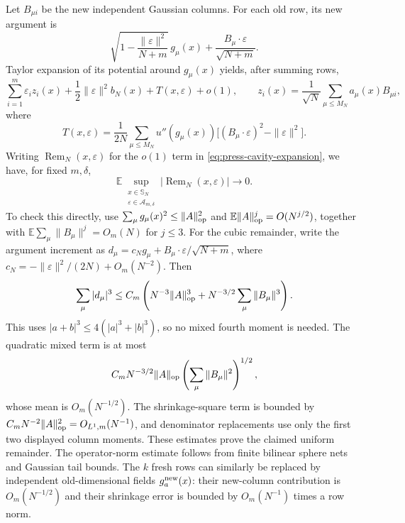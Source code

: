 \documentclass[11pt,a4paper]{article}
\numberwithin{equation}{section}
\theoremstyle{definition}
\theoremstyle{remark}
\newcommand{\E}{\mathbb E}
\newcommand{\eps}{\varepsilon}
\begin{document}
Let $B_{\mu i}$ be the new independent Gaussian columns. For each old row,
its new argument is
\[
 \sqrt{1-\frac{\|\eps\|^2}{N+m}}\,g_\mu(x)
      +\frac{B_\mu\cdot\eps}{\sqrt{N+m}}.
\]
Taylor expansion of its potential around $g_\mu(x)$ yields, after summing rows,
\begin{equation}\label{eq:press-cavity-expansion}
 \sum_{i=1}^m\eps_i z_i(x)+\frac12\|\eps\|^2b_N(x)+T(x,\eps)+o(1),
 \qquad z_i(x)=\frac1{\sqrt N}\sum_{\mu\le M_N}a_\mu(x)B_{\mu i},
\end{equation}
where
\[
 T(x,\eps)=\frac1{2N}\sum_{\mu\le M_N}u''(g_\mu(x))
       \big[(B_\mu\cdot\eps)^2-\|\eps\|^2\big].
\]
Writing $\operatorname{Rem}_N(x,\eps)$ for the $o(1)$ term in
\eqref{eq:press-cavity-expansion}, we have, for fixed $m,\delta$,
\[
 \E\sup_{\substack{x\in\mathbb S_N\\\eps\in\mathcal A_{m,\delta}}}
       |\operatorname{Rem}_N(x,\eps)|\longrightarrow0.
\]
To check this directly, use
$\sum_\mu g_\mu(x)^2\le\|A\|_{\rm op}^2$ and
$\E\|A\|_{\rm op}^j=O(N^{j/2})$, together with
$\E\sum_\mu\|B_\mu\|^j=O_m(N)$ for $j\le3$. For the cubic remainder, write the argument increment as
$d_\mu=c_N g_\mu+B_\mu\cdot\eps/\sqrt{N+m}$, where
$c_N=-\|\eps\|^2/(2N)+O_m(N^{-2})$. Then
\[
 \sum_\mu|d_\mu|^3
 \le C_m\left(N^{-3}\|A\|_{\rm op}^3
                   +N^{-3/2}\sum_\mu\|B_\mu\|^3\right).
\]
This uses $|a+b|^3\le4(|a|^3+|b|^3)$, so no mixed fourth moment is needed.
The quadratic mixed term is at most
\[
 C_m N^{-3/2}\|A\|_{\rm op}
                    \left(\sum_\mu\|B_\mu\|^2\right)^{1/2},
\]
whose mean is $O_m(N^{-1/2})$. The shrinkage-square term is bounded by
$C_mN^{-2}\|A\|_{\rm op}^2=O_{L^1,m}(N^{-1})$, and denominator replacements
use only the first two displayed column moments. These estimates prove the
claimed uniform remainder. The operator-norm
estimate follows from finite bilinear sphere nets and Gaussian tail bounds.
The $k$ fresh rows can similarly be replaced by independent old-dimensional
fields $g_a^{\rm new}(x)$: their new-column contribution is $O_m(N^{-1/2})$
and their shrinkage error is bounded by $O_m(N^{-1})$ times a row norm.
\end{document}
